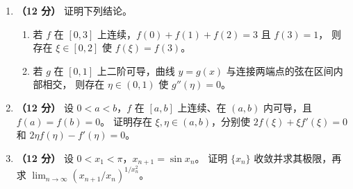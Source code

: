 \documentclass[UTF8,a4paper,zihao=-4,fontset=fandol]{ctexart}
\begin{document}
\newpage
\begin{enumerate}[start=20]
\item \textbf{（12 分）} 证明下列结论。
\begin{enumerate}[label=(\arabic*),nosep]
\item 若 $f$ 在 $[0,3]$ 上连续，$f(0)+f(1)+f(2)=3$ 且 $f(3)=1$，
则存在 $\xi\in[0,2]$ 使 $f(\xi)=f(3)$。
\item 若 $g$ 在 $[0,1]$ 上二阶可导，曲线 $y=g(x)$ 与连接两端点的弦在区间内部相交，
则存在 $\eta\in(0,1)$ 使 $g''(\eta)=0$。
\end{enumerate}
\vspace{5.5cm}
\item \textbf{（12 分）} 设 $0<a<b$，$f$ 在 $[a,b]$ 上连续、在 $(a,b)$ 内可导，且 $f(a)=f(b)=0$。
证明存在 $\xi,\eta\in(a,b)$，分别使
$2f(\xi)+\xi f'(\xi)=0$ 和 $2\eta f(\eta)-f'(\eta)=0$。
\vspace{5.5cm}
\item \textbf{（12 分）} 设 $0<x_1<\pi$，$x_{n+1}=\sin x_n$。
证明 $\{x_n\}$ 收敛并求其极限，再求
$\displaystyle\lim_{n\to\infty}(x_{n+1}/x_n)^{1/x_n^2}$。
\end{enumerate}
\end{document}

